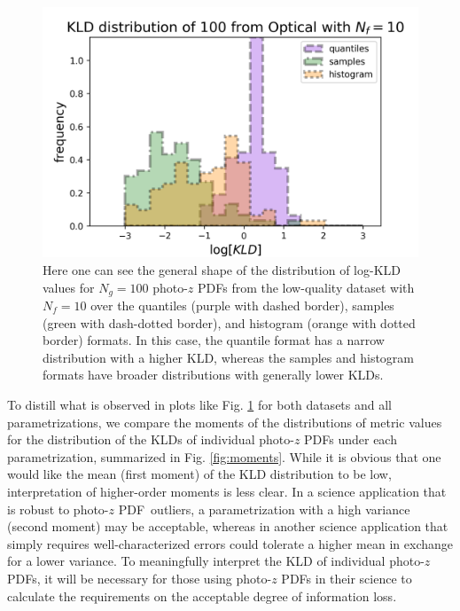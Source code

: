 \documentclass[\docopts]{\docclass}
\newcommand{\pz}{photo-$z$ PDF}
\begin{document}
\begin{figure}
  \includegraphics[width=0.9\columnwidth]{figures/lsst_individual.png}
  \caption{Here one can see the general shape of the distribution of log-KLD 
values for $N_{g}=100$ \pz s from the low-quality dataset with $N_{f}=10$ over 
the quantiles (purple with dashed border), samples (green with dash-dotted 
border), and histogram (orange with dotted border) formats.  In this case, the 
quantile format has a narrow distribution with a higher KLD, whereas the 
samples and histogram formats have broader distributions with generally lower 
KLDs.
  \label{fig:individual}}
\end{figure}

To distill what is observed in plots like Fig. \ref{fig:individual} for both 
datasets and all parametrizations, we compare the moments of the distributions 
of metric values for the distribution of the KLDs of individual \pz s under 
each parametrization, summarized in Fig. \ref{fig:moments}.  While it is 
obvious that one would like the mean (first moment) of the KLD distribution to 
be low, interpretation of higher-order moments is less clear.  In a science 
application that is robust to \pz\ outliers, a parametrization with a high 
variance (second moment) may be acceptable, whereas in another science 
application that simply requires well-characterized errors could tolerate a 
higher mean in exchange for a lower variance.  To meaningfully interpret the 
KLD of individual \pz s, it will be necessary for those using \pz s in their 
science to calculate the requirements on the acceptable degree of information 
loss.
\end{document}
